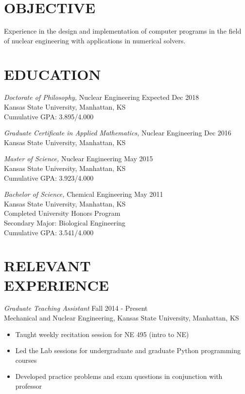 \documentclass[margin, 10pt]{res} %
\begin{document}
\begin{resume}

\section{OBJECTIVE}

Experience in the design and implementation of computer programs in the field
of nuclear engineering with applications in numerical solvers.

\section{EDUCATION}

{\sl Doctorate of Philosophy,} Nuclear Engineering \hfill Expected Dec 2018\\
Kansas State University, Manhattan, KS \\
Cumulative GPA: 3.895/4.000

{\sl Graduate Certificate in Applied Mathematics,} Nuclear Engineering \hfill Dec 2016\\
Kansas State University, Manhattan, KS

{\sl Master of Science,} Nuclear Engineering \hfill May 2015\\
Kansas State University, Manhattan, KS \\
Cumulative GPA: 3.923/4.000

{\sl Bachelor of Science,} Chemical Engineering \hfill May 2011 \\
Kansas State University, Manhattan, KS \\
Completed University Honors Program \\
Secondary Major: Biological Engineering \\
Cumulative GPA: 3.541/4.000

\section{RELEVANT \\ EXPERIENCE}

{\sl Graduate Teaching Assistant} \hfill Fall 2014 - Present \\
Mechanical and Nuclear Engineering, Kansas State University, Manhattan, KS \\
\begin{itemize} \itemsep -2pt %
\item Taught weekly recitation session for NE 495 (intro to NE)
\item Led the Lab sessions for undergraduate and graduate Python programming courses
\item Developed practice problems and exam questions in conjunction with
professor
\end{itemize}


\end{resume}
\end{document}
